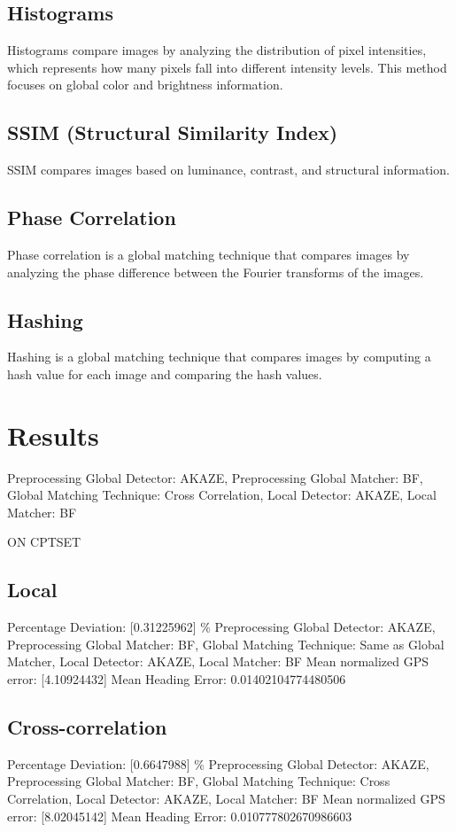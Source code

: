 \begin{itemize}
\subsection*{Histograms}  
Histograms compare images by analyzing the distribution of pixel intensities, which represents how many pixels fall into different intensity levels. This method focuses on global color and brightness information.

\subsection*{SSIM (Structural Similarity Index)}  
SSIM compares images based on luminance, contrast, and structural information. 

\subsection*{Phase Correlation}
Phase correlation is a global matching technique that compares images by analyzing the phase difference between the Fourier transforms of the images.

\subsection*{Hashing}
Hashing is a global matching technique that compares images by computing a hash value for each image and comparing the hash values.



\section*{Results}
Preprocessing Global Detector: AKAZE, Preprocessing Global Matcher: BF, Global Matching Technique: Cross Correlation, Local Detector: AKAZE, Local Matcher: BF

ON CPTSET

\subsection*{Local}

Percentage Deviation: [0.31225962] \%
Preprocessing Global Detector: AKAZE, Preprocessing Global Matcher: BF, Global Matching Technique: Same as Global Matcher, Local Detector: AKAZE, Local Matcher: BF
Mean normalized GPS error: [4.10924432]
 Mean Heading Error: 0.01402104774480506

\subsection*{Cross-correlation}
Percentage Deviation: [0.6647988] \%
Preprocessing Global Detector: AKAZE, Preprocessing Global Matcher: BF, Global Matching Technique: Cross Correlation, Local Detector: AKAZE, Local Matcher: BF
Mean normalized GPS error: [8.02045142]
 Mean Heading Error: 0.010777802670986603



\end{itemize}
